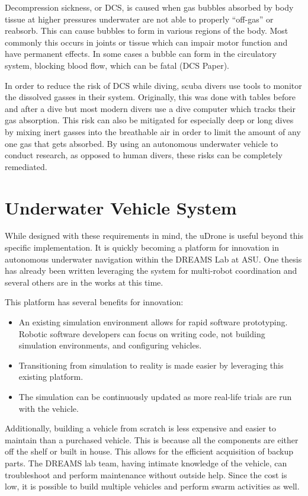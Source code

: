Decompression sickness, or DCS, is caused when gas bubbles absorbed by body tissue at higher pressures underwater are not able to properly “off-gas” or reabsorb. This can cause bubbles to form in various regions of the body. Most commonly this occurs in joints or tissue which can impair motor function and have permanent effects. In some cases a bubble can form in the circulatory system, blocking blood flow, which can be fatal (DCS Paper).

In order to reduce the risk of DCS while diving, scuba divers use tools to monitor the dissolved gasses in their system. Originally, this was done with tables before and after a dive but most modern divers use a dive computer which tracks their gas absorption. This risk can also be mitigated for especially deep or long dives by mixing inert gasses into the breathable air in order to limit the amount of any one gas that gets absorbed. By using an autonomous underwater vehicle to conduct research, as opposed to human divers, these risks can be completely remediated. 

\section{Underwater Vehicle System}
While designed with these requirements in mind, the uDrone is useful beyond this specific implementation. It is quickly becoming a platform for innovation in autonomous underwater navigation within the DREAMS Lab at ASU. One thesis has already been written leveraging the system for multi-robot coordination and several others are in the works at this time.

This platform has several benefits for innovation:
\begin{itemize}
    \item An existing simulation environment allows for rapid software prototyping. Robotic software developers can focus on writing code, not building simulation environments, and configuring vehicles. 
    \item Transitioning from simulation to reality is made easier by leveraging this existing platform.
    \item The simulation can be continuously updated as more real-life trials are run with the vehicle. 
\end{itemize}
    
Additionally, building a vehicle from scratch is less expensive and easier to maintain than a purchased vehicle. This is because all the components are either off the shelf or built in house. This allows for the efficient acquisition of backup parts. The DREAMS lab team, having intimate knowledge of the vehicle, can troubleshoot and perform maintenance without outside help. Since the cost is low, it is possible to build multiple vehicles and perform swarm activities as well.

